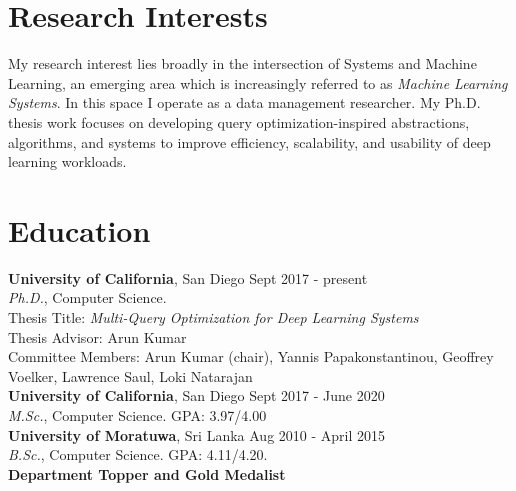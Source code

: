 \documentclass[margin]{res}
\begin{document}

\address{Phone: (+1) 812-558-6888\\ Email: snakanda@eng.ucsd.edu\\ Web: \href{https://scnakandala.github.io}{https://scnakandala.github.io}}
\address{3232 EBU3B CSE\\9500 Gilman Drive\\La Jolla, CA 92093}


\begin{resume}
\vspace{-3mm}
\section{Research Interests}
My research interest lies broadly in the intersection of Systems and Machine Learning, an emerging area which is increasingly referred to as \textit{Machine Learning Systems}. In this space I operate as a data management researcher. My Ph.D. thesis work focuses on developing query optimization-inspired abstractions, algorithms, and systems to improve efficiency, scalability, and usability of deep learning workloads.

\vspace{-2mm}
\section{Education}
\textbf{University of California}, San Diego \hfill Sept 2017 - present\\ 
{\sl Ph.D.}, Computer Science.\\
Thesis Title: \textit{Multi-Query Optimization for Deep Learning Systems}\\
\quad Thesis Advisor: Arun Kumar\\
\quad Committee Members: Arun Kumar (chair), Yannis Papakonstantinou, Geoffrey Voelker, Lawrence Saul, Loki Natarajan\\

\vspace{-5mm}
\textbf{University of California}, San Diego \hfill Sept 2017 - June 2020\\
{\sl M.Sc.}, Computer Science. GPA: 3.97/4.00\\

\vspace{-5mm}
\textbf{University of Moratuwa}, Sri Lanka \hfill Aug 2010 - April 2015\\
{\sl B.Sc.}, Computer Science. GPA: 4.11/4.20.\\
\textbf{Department Topper and Gold Medalist}\\



\end{resume}
\end{document}
